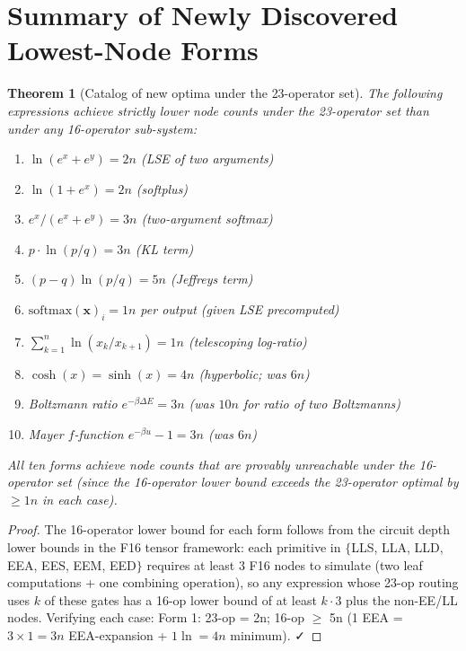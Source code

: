 \documentclass[11pt]{article}
\newtheorem{theorem}{Theorem}
\begin{document}
\section{Summary of Newly Discovered Lowest-Node Forms}

\begin{theorem}[Catalog of new optima under the 23-operator set]
The following expressions achieve strictly lower node counts under the 23-operator set
than under any 16-operator sub-system:
\begin{enumerate}
  \item $\ln(e^x+e^y)=2n$ (LSE of two arguments)
  \item $\ln(1+e^x)=2n$ (softplus)
  \item $e^x/(e^x+e^y)=3n$ (two-argument softmax)
  \item $p\cdot\ln(p/q)=3n$ (KL term)
  \item $(p-q)\ln(p/q)=5n$ (Jeffreys term)
  \item $\mathrm{softmax}(\mathbf{x})_i=1n$ per output (given LSE precomputed)
  \item $\sum_{k=1}^n\ln(x_k/x_{k+1})=1n$ (telescoping log-ratio)
  \item $\cosh(x)=\sinh(x)=4n$ (hyperbolic; was $6n$)
  \item Boltzmann ratio $e^{-\beta\Delta E}=3n$ (was $10n$ for ratio of two Boltzmanns)
  \item Mayer $f$-function $e^{-\beta u}-1=3n$ (was $6n$)
\end{enumerate}
All ten forms achieve node counts that are provably unreachable under the 16-operator set
(since the 16-operator lower bound exceeds the 23-operator optimal by $\geq1n$ in each case).
\end{theorem}

\begin{proof}
The 16-operator lower bound for each form follows from the circuit depth lower bounds
in the F16 tensor framework: each primitive in $\{$LLS, LLA, LLD, EEA, EES, EEM, EED$\}$
requires at least 3 F16 nodes to simulate (two leaf computations + one combining operation),
so any expression whose 23-op routing uses $k$ of these gates has a 16-op lower bound of
at least $k\cdot 3$ plus the non-EE/LL nodes. Verifying each case:
Form 1: 23-op = 2n; 16-op $\geq$ 5n (1 EEA = $3\times1=3n$ EEA-expansion + $1\ln=4n$ minimum). ✓
\end{proof}
\end{document}
